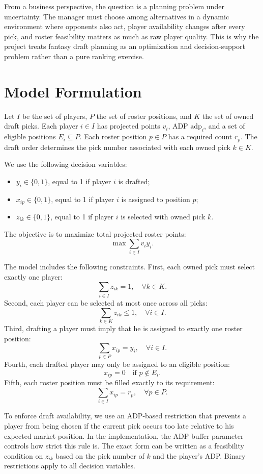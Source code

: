 \documentclass[10pt,a4paper]{article}
\begin{document}
From a business perspective, the question is a planning problem under uncertainty. The manager must choose among alternatives in a dynamic environment where opponents also act, player availability changes after every pick, and roster feasibility matters as much as raw player quality. This is why the project treats fantasy draft planning as an optimization and decision-support problem rather than a pure ranking exercise.

\section{Model Formulation}

Let $I$ be the set of players, $P$ the set of roster positions, and $K$ the set of owned draft picks. Each player $i \in I$ has projected points $v_i$, ADP $\text{adp}_i$, and a set of eligible positions $E_i \subseteq P$. Each roster position $p \in P$ has a required count $r_p$. The draft order determines the pick number associated with each owned pick $k \in K$.

We use the following decision variables:
\begin{itemize}[leftmargin=1.5em]
  \item $y_i \in \{0,1\}$, equal to 1 if player $i$ is drafted;
  \item $x_{ip} \in \{0,1\}$, equal to 1 if player $i$ is assigned to position $p$;
  \item $z_{ik} \in \{0,1\}$, equal to 1 if player $i$ is selected with owned pick $k$.
\end{itemize}

The objective is to maximize total projected roster points:
\[
\max \sum_{i \in I} v_i y_i.
\]

The model includes the following constraints. First, each owned pick must select exactly one player:
\[
\sum_{i \in I} z_{ik} = 1, \quad \forall k \in K.
\]
Second, each player can be selected at most once across all picks:
\[
\sum_{k \in K} z_{ik} \le 1, \quad \forall i \in I.
\]
Third, drafting a player must imply that he is assigned to exactly one roster position:
\[
\sum_{p \in P} x_{ip} = y_i, \quad \forall i \in I.
\]
Fourth, each drafted player may only be assigned to an eligible position:
\[
x_{ip} = 0 \quad \text{if } p \notin E_i.
\]
Fifth, each roster position must be filled exactly to its requirement:
\[
\sum_{i \in I} x_{ip} = r_p, \quad \forall p \in P.
\]

To enforce draft availability, we use an ADP-based restriction that prevents a player from being chosen if the current pick occurs too late relative to his expected market position. In the implementation, the ADP buffer parameter controls how strict this rule is. The exact form can be written as a feasibility condition on $z_{ik}$ based on the pick number of $k$ and the player's ADP. Binary restrictions apply to all decision variables.
\end{document}
